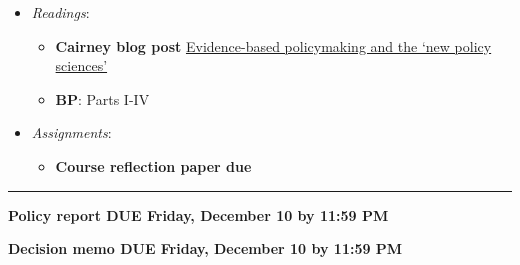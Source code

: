 \begin{itemize}

\item
  \emph{Readings}:

  \begin{itemize}
  
  \item
    \textbf{Cairney blog post}
    \href{https://paulcairney.wordpress.com/2018/10/25/evidence-based-policymaking-and-the-new-policy-sciences-2/}{Evidence-based
    policymaking and the `new policy sciences'}
  \item
    \textbf{BP}: Parts I-IV
  \end{itemize}
\item
  \emph{Assignments}:

  \begin{itemize}
  
  \item
    \textbf{Course reflection paper due}
  \end{itemize}
\end{itemize}

\begin{center}\rule{0.5\linewidth}{0.5pt}\end{center}

\textbf{Policy report DUE Friday, December 10 by 11:59 PM}

\textbf{Decision memo DUE Friday, December 10 by 11:59 PM}
